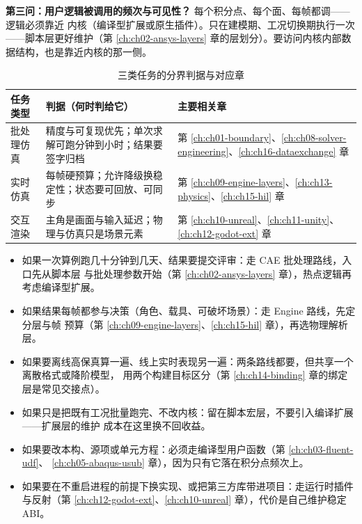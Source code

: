 \documentclass[12pt,a4paper,fontset=fandol]{ctexbook}
\newcommand{\Lang}[1]{\textsf{#1}}
\newcommand{\DomCAE}{\Lang{CAE}}
\newcommand{\DomEngine}{\Lang{Engine}}
\begin{document}
\textbf{第三问：用户逻辑被调用的频次与可见性？} 每个积分点、每个面、每帧都调——逻辑必须靠近
内核（编译型扩展或原生插件）。只在建模期、工况切换期执行一次——脚本层更好维护（第
\ref{ch:ch02-ansys-layers} 章的层划分）。要访问内核内部数据结构，也是靠近内核的那一侧。

\begin{table}[htbp]
\centering
\small
\caption{三类任务的分界判据与对应章}
\label{tab:ch18-three-kinds}
\begin{tabular}{>{\raggedright\arraybackslash}p{}
                >{\raggedright\arraybackslash}p{}
                >{\raggedright\arraybackslash}p{}}
\toprule
\textbf{任务类型} & \textbf{判据（何时判给它）} & \textbf{主要相关章} \\
\midrule
批处理仿真 & 精度与可复现优先；单次求解可跑分钟到小时；结果要签字归档 &
第 \ref{ch:ch01-boundary}、\ref{ch:ch08-solver-engineering}、\ref{ch:ch16-dataexchange} 章 \\
实时仿真 & 每帧硬预算；允许降级换稳定性；状态要可回放、可同步 &
第 \ref{ch:ch09-engine-layers}、\ref{ch:ch13-physics}、\ref{ch:ch15-hil} 章 \\
交互渲染 & 主角是画面与输入延迟；物理与仿真只是场景元素 &
第 \ref{ch:ch10-unreal}、\ref{ch:ch11-unity}、\ref{ch:ch12-godot-ext} 章 \\
\bottomrule
\end{tabular}
\end{table}

\begin{compare}[title={如果……就走……：第一层的六条分支}]
\begin{itemize}
\item 如果一次算例跑几十分钟到几天、结果要提交评审：走 \DomCAE{} 批处理路线，入口先从脚本层
      与批处理参数开始（第 \ref{ch:ch02-ansys-layers} 章），热点逻辑再考虑编译型扩展。
\item 如果结果每帧都参与决策（角色、载具、可破坏场景）：走 \DomEngine{} 路线，先定分层与帧
      预算（第 \ref{ch:ch09-engine-layers}、\ref{ch:ch15-hil} 章），再选物理解析层。
\item 如果要离线高保真算一遍、线上实时表现另一遍：两条路线都要，但共享一个离散格式或降阶模型，
      用两个构建目标区分（第 \ref{ch:ch14-binding} 章的绑定层是常见交接点）。
\item 如果只是把既有工况批量跑完、不改内核：留在脚本宏层，不要引入编译扩展——扩展层的维护
      成本在这里换不回收益。
\item 如果要改本构、源项或单元方程：必须走编译型用户函数（第 \ref{ch:ch03-fluent-udf}、
      \ref{ch:ch05-abaqus-usub} 章），因为只有它落在积分点频次上。
\item 如果要在不重启进程的前提下换实现、或把第三方库带进项目：走运行时插件与反射（第
      \ref{ch:ch12-godot-ext}、\ref{ch:ch10-unreal} 章），代价是自己维护稳定 ABI。
\end{itemize}
\end{compare}
\end{document}
